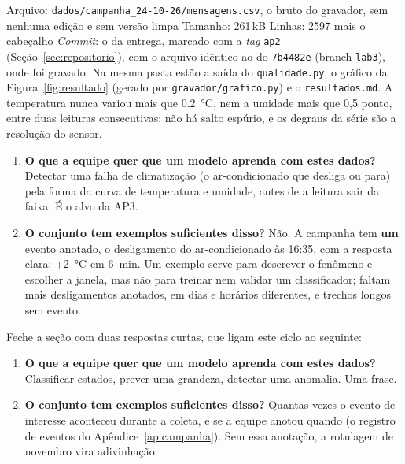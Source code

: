 \noindent Arquivo: \texttt{dados/campanha\_24-10-26/mensagens.csv}, o
bruto do gravador, sem nenhuma edição e sem versão limpa \quad Tamanho:
261\,kB \quad Linhas: \num{2597} mais o cabeçalho \quad \emph{Commit}:
o da entrega, marcado com a \emph{tag} \texttt{ap2} (Seção~\ref{sec:repositorio}),
com o arquivo idêntico ao do \texttt{7b4482e} (branch \texttt{lab3}),
onde foi gravado. Na mesma pasta estão a saída
do \texttt{qualidade.py}, o gráfico da Figura~\ref{fig:resultado}
(gerado por \texttt{gravador/grafico.py}) e o \texttt{resultados.md}. A
temperatura nunca variou mais que \SI{0,2}{\celsius}, nem a umidade
mais que 0,5 ponto, entre duas leituras consecutivas: não há salto
espúrio, e os degraus da série são a resolução do sensor.

\begin{enumerate}[label=\arabic*.]
  \item \textbf{O que a equipe quer que um modelo aprenda com estes
    dados?} Detectar uma falha de climatização (o ar-condicionado que
    desliga ou para) pela forma da curva de temperatura e umidade,
    antes de a leitura sair da faixa. É o alvo da AP3.
  \item \textbf{O conjunto tem exemplos suficientes disso?} Não. A
    campanha tem \textbf{um} evento anotado, o desligamento do
    ar-condicionado às 16:35, com a resposta clara: $+$\SI{2}{\celsius}
    em \SI{6}{\minute}. Um exemplo serve para descrever o fenômeno e
    escolher a janela, mas não para treinar nem validar um
    classificador; faltam mais desligamentos anotados, em dias e horários
    diferentes, e trechos longos sem evento.
\end{enumerate}

\begin{orientacao}
Feche a seção com duas respostas curtas, que ligam este ciclo ao seguinte:

\begin{enumerate}[label=\arabic*.]
  \item \textbf{O que a equipe quer que um modelo aprenda com estes
    dados?} Classificar estados, prever uma grandeza, detectar uma
    anomalia. Uma frase.
  \item \textbf{O conjunto tem exemplos suficientes disso?} Quantas vezes
    o evento de interesse aconteceu durante a coleta, e se a equipe
    anotou quando (o registro de eventos do Apêndice~\ref{ap:campanha}).
    Sem essa anotação, a rotulagem de novembro vira adivinhação.
\end{enumerate}
\end{orientacao}
